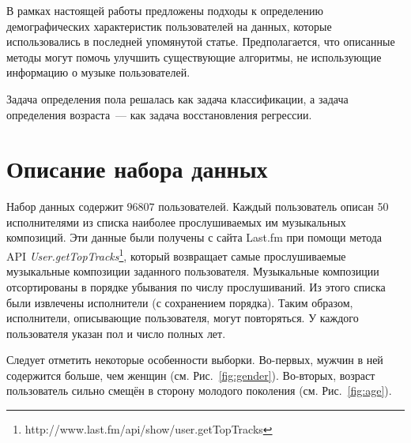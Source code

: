 \documentclass{spisok-article}
\begin{document}
В рамках настоящей работы предложены подходы к определению
демографических характеристик пользователей на данных, которые
использовались в последней упомянутой статье. Предполагается,
что описанные методы могут помочь улучшить существующие алгоритмы,
не использующие информацию о музыке пользователей.

Задача определения пола решалась как задача 
классификации, а задача определения возраста~--- как
задача восстановления регрессии.


\section{Описание набора данных}

Набор данных содержит $96807$ пользователей.
Каждый пользователь описан 50 исполнителями из списка наиболее
прослушиваемых им музыкальных композиций. Эти данные были получены
с сайта Last.fm при помощи метода API 
\textit{User.getTopTracks}\footnote{
http://www.last.fm/api/show/user.getTopTracks}, который возвращает
самые прослушиваемые музыкальные композиции заданного пользователя.
Музыкальные композиции отсортированы в порядке убывания по числу
прослушиваний. Из этого списка были извлечены исполнители (с сохранением
порядка). Таким образом, исполнители, описывающие
пользователя, могут повторяться.
У каждого пользователя указан пол и число полных лет.

Следует отметить некоторые особенности выборки. Во-первых,
мужчин в ней содержится больше, чем женщин (см. Рис.~\ref{fig:gender}).
Во-вторых, возраст пользователь сильно смещён в сторону молодого
поколения (см. Рис.~\ref{fig:age}).
\end{document}
